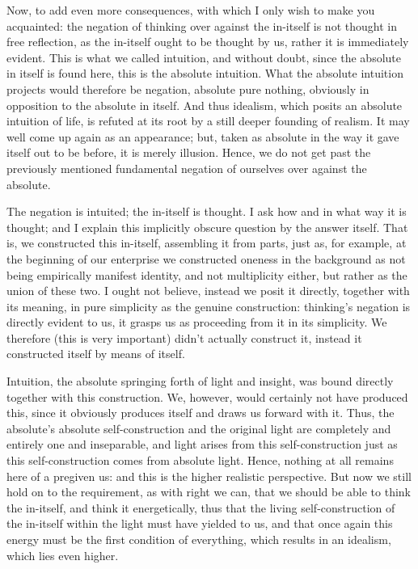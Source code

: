 Now, to add even more consequences,
with which I only wish to make you acquainted:
the negation of thinking over against the in-itself
is not thought in free reflection,
as the in-itself ought to be thought by us,
rather it is immediately evident.
This is what we called intuition, and without doubt,
since the absolute in itself is found here,
this is the absolute intuition.
What the absolute intuition projects
would therefore be negation, absolute pure nothing,
obviously in opposition to the absolute in itself.
And thus idealism, which posits an absolute intuition of life, is
refuted at its root by a still deeper founding of realism.
It may well come up again as an appearance;
but, taken as absolute in the way it gave itself
out to be before, it is merely illusion.
Hence, we do not get past the previously mentioned
fundamental negation of ourselves over against the absolute.

The negation is intuited;
the in-itself is thought.
I ask how and in what way it is thought;
and I explain this implicitly obscure question
by the answer itself.
That is, we constructed this in-itself,
assembling it from parts, just as, for example,
at the beginning of our enterprise we constructed
oneness in the background as not being
empirically manifest identity,
and not multiplicity either,
but rather as the union of these two.
I ought not believe, instead we posit it directly,
together with its meaning,
in pure simplicity as the genuine construction:
thinking’s negation is directly evident to us,
it grasps us as proceeding from it in its simplicity.
We therefore (this is very important)
didn’t actually construct it,
instead it constructed itself
by means of itself.

Intuition, the absolute springing forth of light and insight,
was bound directly together with this construction.
We, however, would certainly not have produced this,
since it obviously produces itself and draws us forward with it.
Thus, the absolute’s absolute self-construction
and the original light are completely and entirely one and inseparable,
and light arises from this self-construction
just as this self-construction comes from absolute light.
Hence, nothing at all remains here of a pregiven us:
and this is the higher realistic perspective.
But now we still hold on to the requirement, as with right we can,
that we should be able to think the in-itself,
and think it energetically,
thus that the living self-construction of
the in-itself within the light must have yielded to us,
and that once again this energy must be
the first condition of everything,
which results in an idealism,
which lies even higher.

